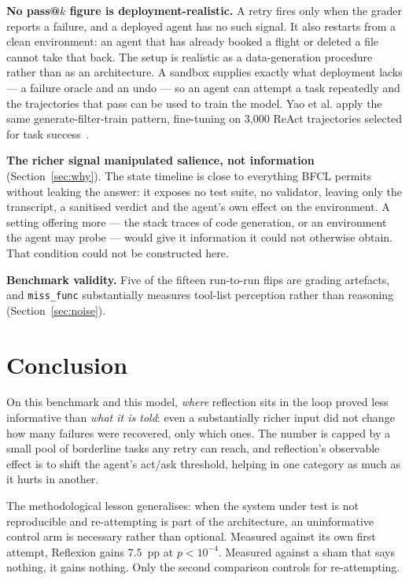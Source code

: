 \documentclass[a4paper, 12pt]{article}
\begin{document}
\textbf{No pass@$k$ figure is deployment-realistic.} A retry fires only when
the grader reports a failure, and a deployed agent has no such signal.
It also restarts from a clean environment: an agent that has already booked
a flight or deleted a file cannot take that back. The setup is realistic as a
data-generation procedure rather than as an architecture. A sandbox supplies exactly
what deployment lacks --- a failure oracle and an undo --- so an agent
can attempt a task repeatedly and the trajectories that pass can be used to train the model.
Yao et al. apply the same generate-filter-train pattern, fine-tuning on
3{,}000 ReAct trajectories selected for task success~\cite{yao2023react}.

\textbf{The richer signal manipulated salience, not information}
(Section~\ref{sec:why}). The state timeline is close to everything BFCL permits
without leaking the answer: it exposes no test suite, no validator, leaving only
the transcript, a sanitised verdict and the agent's own effect on the environment.
A setting offering more --- the stack traces of code generation, or an environment
the agent may probe --- would give it information it could not otherwise obtain.
That condition could not be constructed here.

\textbf{Benchmark validity.} Five of the fifteen run-to-run flips are grading
artefacts, and \texttt{miss\_func} substantially measures tool-list perception
rather than reasoning (Section~\ref{sec:noise}).

\section{Conclusion}

On this benchmark and this model, \emph{where} reflection sits in the loop
proved less informative than \emph{what it is told}: even a substantially richer
input did not change how many failures were recovered, only which ones. The
number is capped by a small pool of borderline tasks any retry can reach, and
reflection's observable effect is to shift the agent's act/ask threshold,
helping in one category as much as it hurts in another.

The methodological lesson generalises: when the system under test is not
reproducible and re-attempting is part of the architecture, an uninformative
control arm is necessary rather than optional. Measured against its own first attempt,
Reflexion gains $7.5$~pp at $p<10^{-4}$. Measured against a sham that says
nothing, it gains nothing. Only the second comparison controls for re-attempting.
\end{document}
